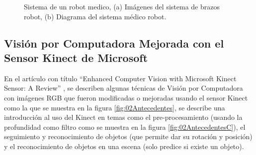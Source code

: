         \begin{figure}[!htb]
        	\centering
        	\caption[Sistema de un robot medico.]{Sistema de un robot medico, (a)  Imágenes del sistema de brazos robot, (b) Diagrama del sistema médico robot. 
        	\label{fig:04Antecedentes}}
        \end{figure}
    
    
    \subsection{Visión por Computadora Mejorada con el Sensor Kinect de Microsoft }
    
        En el artículo con título “Enhanced Computer Vision with Microsoft Kinect Sensor: A Review” \cite{CompVisionKinect}, se describen algunas técnicas de Visión por Computadora con imágenes RGB que fueron modificadas o mejoradas usando el sensor Kinect como la que se muestra en la figura \ref{fig:02Antecedentes}, se describe una introducción al uso del Kinect en temas como el pre-procesamiento (usando la profundidad como filtro como se muestra en la figura \ref{fig:02AntecedentesC}), el seguimiento y reconocimiento de objetos (que permite dar su rotación y posición) y el reconocimiento de objetos en una escena (solo predice si existe un objeto).\\
        
